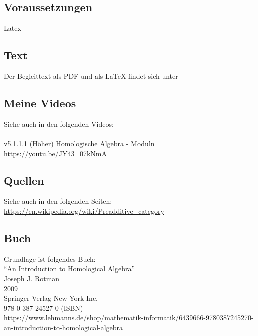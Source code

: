 \documentclass[a4paper]{amsart}
\theoremstyle{definition}
\begin{document}
\subsection*{Voraussetzungen}
Latex

\subsection*{Text}
Der Begleittext als PDF und als LaTeX findet sich unter
{\tiny
   \url{}
}

\subsection*{Meine Videos}
Siehe auch in den folgenden Videos:\\
\\
v5.1.1.1 (Höher) Homologische Algebra - Moduln\\
\url{https://youtu.be/JY43_07kNmA}

\subsection*{Quellen}
Siehe auch in den folgenden Seiten:\\
\url{https://en.wikipedia.org/wiki/Preadditive_category}


\subsection*{Buch}
Grundlage ist folgendes Buch:\\
"`An Introduction to Homological Algebra"'\\
Joseph J. Rotman\\
2009\\
Springer-Verlag New York Inc.\\
978-0-387-24527-0 (ISBN)\\
{\tiny
   \url{https://www.lehmanns.de/shop/mathematik-informatik/6439666-9780387245270-an-introduction-to-homological-algebra}}\\
\\
\end{document}
